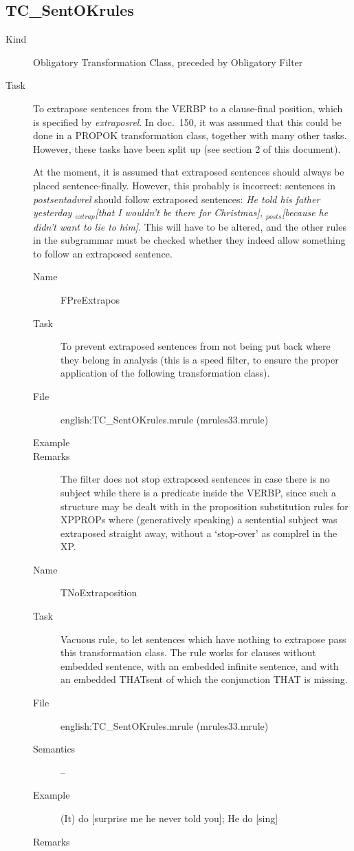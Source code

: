 \newpage
\subsection{TC\_SentOKrules}

\begin{description}
\item[Kind] Obligatory Transformation Class, preceded by Obligatory Filter
\item[Task] To extrapose sentences from the VERBP to a clause-final position,
which is specified by {\em extraposrel\/}. In doc.\ 150, it was assumed that 
this could be done in a PROPOK transformation class, together with many other 
tasks. However, these tasks have been split up (see section 2 of this document).

At the moment, it is assumed that extraposed sentences should always be placed 
sentence-finally. However, this probably is incorrect: sentences in {\em 
postsentadvrel\/} should follow extraposed sentences: {\em He told his 
father yesterday $_{extrap}$[that I wouldn't be there for Christmas], 
$_{posts}$[because he didn't want to lie to him]\/}. This will have to be 
altered, and the other rules in the subgrammar must be checked whether they 
indeed allow something to follow an extraposed sentence.

\vspace{1 cm}
\begin{description}
\item[Name] FPreExtrapos
\item[Task] To prevent extraposed sentences from not being put back where they 
belong in analysis (this is a speed filter, to ensure the proper application of 
the following transformation class).
\item[File] english:TC\_SentOKrules.mrule (mrules33.mrule)
\item[Example] 
\item[Remarks] The filter does not stop extraposed sentences in case there is 
no subject while there is a predicate inside the VERBP, since such a structure 
may be dealt with in the proposition 
substitution rules for XPPROPs where (generatively speaking) a sentential 
subject was extraposed straight away, without a `stop-over' as complrel in the 
XP.
\end{description}

\vspace{1 cm}
\begin{description}
\item[Name] TNoExtraposition
\item[Task] Vacuous rule, to let sentences which have nothing to extrapose pass 
this transformation class. The rule works for clauses without embedded 
sentence, with an embedded infinite sentence, and with an embedded THATsent of 
which the conjunction THAT is missing.
\item[File] english:TC\_SentOKrules.mrule (mrules33.mrule)
\item[Semantics] --
\item[Example] (It) do [surprise me he never told you]; He do [sing]
\item[Remarks] 
\end{description}


\end{description}
